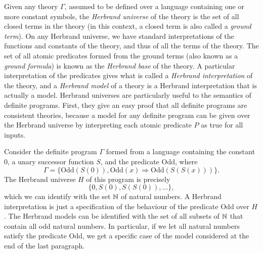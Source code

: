Given any theory $\Gamma$, assumed to be defined over a language containing one or more constant symbols, the \emph{Herbrand universe} of the theory is the set of all closed terms in the theory (in this context, a closed term is also called a \emph{ground term}). On any Herbrand universe, we have standard interpretations of the functions and constants of the theory, and thus of all the terms of the theory. The set of all atomic predicates formed from the ground terms (also known as a \emph{ground formula}) is known as the \emph{Herbrand base} of the theory. A particular interpretation of the predicates gives what is called a \emph{Herbrand interpretation} of the theory, and a \emph{Herbrand model} of a theory is a Herbrand interpretation that is actually a model. Herbrand universes are particularly useful to the semantics of definite programs. First, they give an easy proof that all definite programs are consistent theories, because a model for any definite program can be given over the Herbrand universe by interpreting each atomic predicate $P$ as true for all inputs.

\begin{example}
    Consider the definite program $\Gamma$ formed from a language containing the constant $0$, a unary successor function $S$, and the predicate $\text{Odd}$, where
    \[ \Gamma = \{ \text{Odd}(S(0)), \text{Odd}(x) \Rightarrow \text{Odd}(S(S(x))) \}. \]
    The Herbrand universe $H$ of this program is precisely
    \[ \{ 0, S(0), S(S(0)), \dots \}, \]
    which we can identify with the set $\operatorname{\mathbb{N}}$ of natural numbers. A Herbrand interpretation is just a specification of the behaviour of the predicate $\text{Odd}$ over $H$. The Herbrand models can be identified with the set of all subsets of $\operatorname{\mathbb{N}}$ that contain all odd natural numbers. In particular, if we let all natural numbers satisfy the predicate $\text{Odd}$, we get a specific case of the model considered at the end of the last paragraph.
\end{example}

